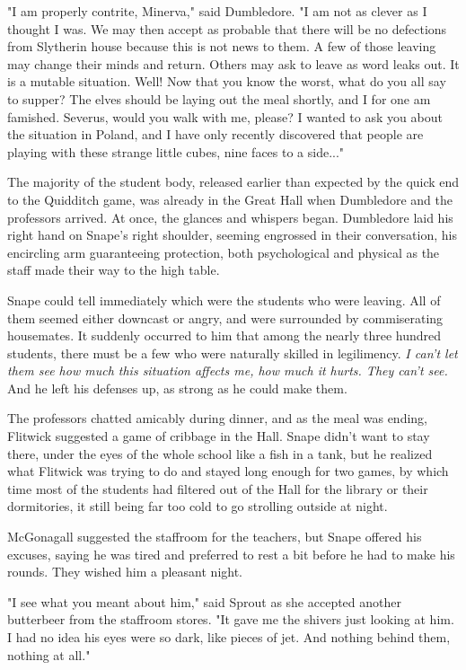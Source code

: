 "I am properly contrite, Minerva," said Dumbledore. "I am not as clever as I thought I was. We may then accept as probable that there will be no defections from Slytherin house because this is not news to them. A few of those leaving may change their minds and return. Others may ask to leave as word leaks out. It is a mutable situation. Well! Now that you know the worst, what do you all say to supper? The elves should be laying out the meal shortly, and I for one am famished. Severus, would you walk with me, please? I wanted to ask you about the situation in Poland, and I have only recently discovered that people are playing with these strange little cubes, nine faces to a side..."

The majority of the student body, released earlier than expected by the quick end to the Quidditch game, was already in the Great Hall when Dumbledore and the professors arrived. At once, the glances and whispers began. Dumbledore laid his right hand on Snape's right shoulder, seeming engrossed in their conversation, his encircling arm guaranteeing protection, both psychological and physical as the staff made their way to the high table.

Snape could tell immediately which were the students who were leaving. All of them seemed either downcast or angry, and were surrounded by commiserating housemates. It suddenly occurred to him that among the nearly three hundred students, there must be a few who were naturally skilled in legilimency. \emph{I can't let them see how much this situation affects me, how much it hurts. They can't see.} And he left his defenses up, as strong as he could make them.

The professors chatted amicably during dinner, and as the meal was ending, Flitwick suggested a game of cribbage in the Hall. Snape didn't want to stay there, under the eyes of the whole school like a fish in a tank, but he realized what Flitwick was trying to do and stayed long enough for two games, by which time most of the students had filtered out of the Hall for the library or their dormitories, it still being far too cold to go strolling outside at night.

McGonagall suggested the staffroom for the teachers, but Snape offered his excuses, saying he was tired and preferred to rest a bit before he had to make his rounds. They wished him a pleasant night.

"I see what you meant about him," said Sprout as she accepted another butterbeer from the staffroom stores. "It gave me the shivers just looking at him. I had no idea his eyes were so dark, like pieces of jet. And nothing behind them, nothing at all."

